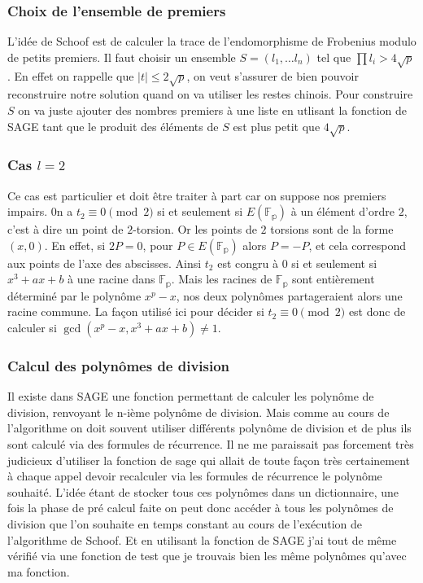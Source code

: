 \documentclass{article}
\begin{document}
\subsubsection{Choix de l'ensemble de premiers}
L'idée de Schoof est de calculer la trace de l'endomorphisme de Frobenius modulo de petits premiers. Il faut choisir un ensemble $S = (l_1, \ldots l_n)$ tel que $\prod l_i > 4\sqrt{p}$. En effet on rappelle que  $|t| \leq 2 \sqrt{p}$, on veut s'assurer de bien pouvoir reconstruire notre solution quand on va utiliser les restes chinois. Pour construire $S$ on va juste ajouter des nombres premiers à une liste en utlisant la fonction  de SAGE tant que le produit des éléments de $S$ est plus petit que $ 4\sqrt{p}$.



\subsubsection{Cas $l=2$}
Ce cas est particulier et doit être traiter à part car on suppose nos premiers impairs. 0n a $t_2 \equiv 0 \pmod 2$ si et seulement si $E(\mathbb{F_p})$ à un élément d'ordre $2$, c'est à dire un point de $2$-torsion. Or les points de $2$ torsions sont de la forme $(x, 0)$. En effet, si $2P = 0$, pour $P \in E(\mathbb{F_p})$ alors $P = -P$, et cela correspond aux points de l'axe des abscisses. Ainsi $t_2$ est congru à $0$ si et seulement si $x^3 +ax +b$ à une racine dans $\mathbb{F_p}$. Mais les racines de $\mathbb{F_p}$ sont entièrement déterminé par le polynôme $x^p - x$, nos deux polynômes partageraient alors une racine commune. La façon utilisé ici pour décider si $t_2 \equiv 0 \pmod 2$ est donc de calculer si $\gcd(x^p - x, x^3 +ax +b) \ne 1$.

\subsubsection{Calcul des polynômes de division}
Il existe dans SAGE une fonction permettant de calculer les polynôme de division,  renvoyant le n-ième polynôme de division. Mais comme au cours de l'algorithme on doit souvent utiliser différents polynôme de division et de plus ils sont calculé via des formules de récurrence. Il ne me paraissait pas forcement très judicieux d'utiliser la fonction de sage qui allait de toute façon très certainement à chaque appel devoir recalculer via les formules de récurrence le polynôme souhaité. L'idée étant de stocker tous ces polynômes dans un dictionnaire, une fois la phase de pré calcul faite on peut donc accéder à tous les polynômes de division que l'on souhaite en temps constant au cours de l’exécution de l'algorithme de Schoof. Et en utilisant la fonction de SAGE j'ai tout de même vérifié via une fonction de test que je trouvais bien les même polynômes qu'avec ma fonction.
\end{document}
